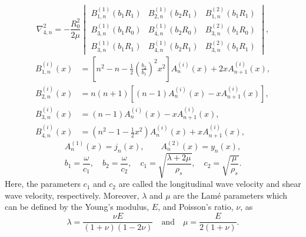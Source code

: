 \begin{equation*}
	\nabla^2_{4,n} = -\frac{R_0^2}{2\mu}\begin{vmatrix}
		B_{1,n}^{(1)}(b_1 R_1) & B_{2,n}^{(1)}(b_2 R_1) & B_{1,n}^{(2)}(b_1 R_1)\\
		B_{3,n}^{(1)}(b_1 R_0) & B_{4,n}^{(1)}(b_2 R_0) & B_{3,n}^{(2)}(b_1 R_0)\\
		B_{3,n}^{(1)}(b_1 R_1) & B_{4,n}^{(1)}(b_2 R_1) & B_{3,n}^{(2)}(b_1 R_1)
	\end{vmatrix},
\end{equation*}
\begin{align*}
	B_{1,n}^{(i)}(x) &= \left[n^2-n-\frac{1}{2}\left(\frac{b_2}{b_1}\right)^2 x^2\right] A_n^{(i)}(x) + 2xA_{n+1}^{(i)}(x),\\
	B_{2,n}^{(i)}(x) &= n(n+1)\left[(n-1)A_n^{(i)}(x) - xA_{n+1}^{(i)}(x)\right],\\
	B_{3,n}^{(i)}(x) &= (n-1) A_n^{(i)}(x) - xA_{n+1}^{(i)}(x),\\
	B_{4,n}^{(i)}(x) &= \left(n^2-1-\frac{1}{2}x^2\right) A_n^{(i)}(x) + xA_{n+1}^{(i)}(x),
\end{align*}
\begin{equation*}
	A_{n}^{(1)}(x) = j_n(x),\qquad A_{n}^{(2)}(x) = y_n(x),
\end{equation*}
\begin{equation*}
	b_1=\frac{\omega}{c_1},\quad b_2=\frac{\omega}{c_2},\quad c_1 = \sqrt{\frac{\lambda+2\mu}{\rho_s}},\quad c_2 = \sqrt{\frac{\mu}{\rho_s}}.
\end{equation*}
Here, the parameters $c_1$ and $c_2$ are called the longitudinal wave velocity and shear wave velocity, respectively. Moreover, $\lambda$ and $\mu$ are the Lam{\'e} parameters which can be defined by the Young's modulus, $E$, and Poisson's ratio, $\nu$, as
\begin{equation*}
	\lambda = \frac{\nu E}{(1+\nu)(1-2\nu)}\quad\text{and}\quad \mu = \frac{E}{2(1+\nu)}.
\end{equation*}
